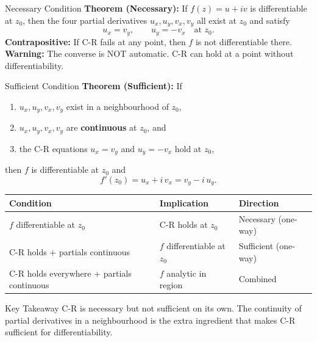 \documentclass[12pt,a4paper]{article}
\begin{document}
\begin{infobox}{Necessary Condition}
\textbf{Theorem (Necessary):} If $f(z) = u+iv$ is differentiable at $z_0$, then the four partial derivatives $u_x, u_y, v_x, v_y$ all exist at $z_0$ and satisfy
\[
  u_x = v_y, \qquad u_y = -v_x \quad \text{at } z_0.
\]
\textbf{Contrapositive:} If C-R fails at any point, then $f$ is not differentiable there.\\
\textbf{Warning:} The converse is NOT automatic. C-R can hold at a point without differentiability.
\end{infobox}

\medskip

\begin{infobox}{Sufficient Condition}
\textbf{Theorem (Sufficient):} If
\begin{enumerate}[noitemsep]
  \item $u_x, u_y, v_x, v_y$ exist in a neighbourhood of $z_0$,
  \item $u_x, u_y, v_x, v_y$ are \textbf{continuous} at $z_0$, and
  \item the C-R equations $u_x = v_y$ and $u_y = -v_x$ hold at $z_0$,
\end{enumerate}
then $f$ is differentiable at $z_0$ and
\[
  f'(z_0) = u_x + i\,v_x = v_y - i\,u_y.
\]
\end{infobox}

\medskip

\begin{center}
\begin{tabular}{lll}
\toprule
\textbf{Condition} & \textbf{Implication} & \textbf{Direction} \\
\midrule
$f$ differentiable at $z_0$ & C-R holds at $z_0$ & Necessary (one-way) \\
C-R holds + partials continuous & $f$ differentiable at $z_0$ & Sufficient (one-way) \\
C-R holds everywhere + partials continuous & $f$ analytic in region & Combined \\
\bottomrule
\end{tabular}
\end{center}

\begin{learnbox}{Key Takeaway}
C-R is necessary but not sufficient on its own. The continuity of partial derivatives in a neighbourhood is the extra ingredient that makes C-R sufficient for differentiability.
\end{learnbox}

\end{document}
